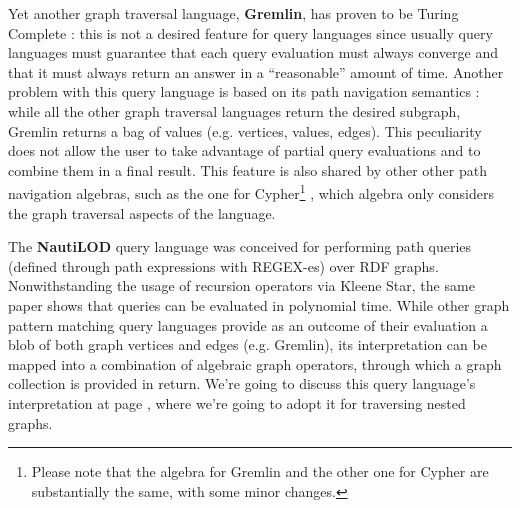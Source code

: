 Yet another graph traversal language, \textbf{Gremlin}, has proven to be Turing Complete \cite{Rodriguez15}:
this is not a desired feature for query languages since usually query languages must guarantee that
each query evaluation must always converge and that it must always return an answer in a ``reasonable'' amount of time.
Another problem with this query language is based on its path navigation semantics \cite{ThakkarPAV17}:
while all the other graph traversal languages return the desired subgraph, Gremlin returns
a bag of values (e.g. vertices, values, edges). This peculiarity does not allow the user to take advantage
of partial query evaluations and to combine them in a final result. This feature is
also shared by other other path navigation algebras, such as the one for Cypher\footnote{Please note that the algebra \cite{ThakkarPAV17} for Gremlin and the other one \cite{Neo4jAlg,MartonSV17} for Cypher are substantially the same, with some minor changes.} \cite{Neo4jAlg,MartonSV17}, which algebra only considers  the graph traversal aspects of the language.


The \textbf{NautiLOD} \cite{NautiLOD} query language was conceived for performing path queries (defined through
path expressions with REGEX-es) over
RDF graphs. Nonwithstanding the usage of recursion operators via Kleene Star, the same paper shows  that queries can be evaluated in polynomial time.
While other graph pattern matching query languages provide as an outcome of their evaluation a blob of both graph vertices and edges (e.g. Gremlin), its interpretation can be mapped into a combination of algebraic graph operators, through which a graph collection is provided in return. We're going to discuss this query language's interpretation at page \pageref{ph:NTLImpl}, where we're going to adopt it for traversing nested graphs.

